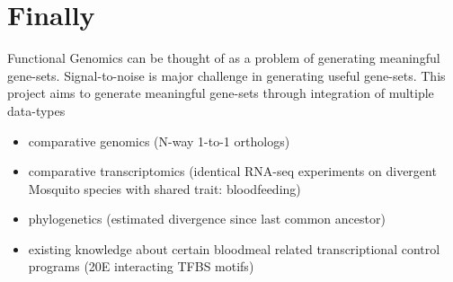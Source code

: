 



\section{Finally}

Functional Genomics can be thought of as a problem of generating meaningful gene-sets.
Signal-to-noise is major challenge in generating useful gene-sets. This project aims to generate meaningful gene-sets through integration of multiple data-types

\begin{itemize}
    \item comparative genomics (N-way 1-to-1 orthologs)

    \item comparative transcriptomics (identical RNA-seq experiments on divergent Mosquito species with shared trait: bloodfeeding)

    \item phylogenetics (estimated divergence since last common ancestor)

    \item existing knowledge about certain bloodmeal related transcriptional control programs (20E interacting TFBS motifs)
\end{itemize}




